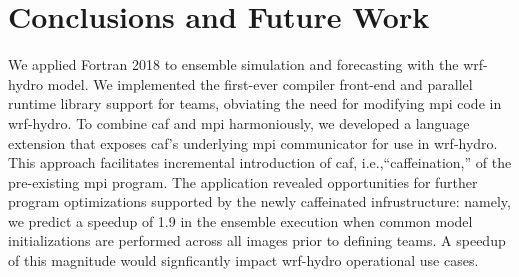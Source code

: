 \section{Conclusions and Future Work}\label{sec:conclusions}
We applied Fortran 2018 to ensemble simulation and forecasting with the \gls{wrf-hydro} model.
We implemented the first-ever compiler front-end and parallel runtime library support
for teams, obviating the need for modifying \gls{mpi} code in \gls{wrf-hydro}.  To combine
\gls{caf} and \gls{mpi} harmoniously, we developed a language extension that exposes \gls{caf}'s
underlying \gls{mpi} communicator for use in \gls{wrf-hydro}.  This approach facilitates
incremental introduction of \gls{caf}, i.e.,``caffeination,'' of the
pre-existing \gls{mpi} program. The application revealed opportunities for further
program optimizations supported by the newly caffeinated infrustructure:
namely, we predict a speedup of 1.9 in the ensemble execution when common model initializations
are performed across all images prior to defining teams.  A speedup of this magnitude would
signficantly impact \gls{wrf-hydro} operational use cases.




